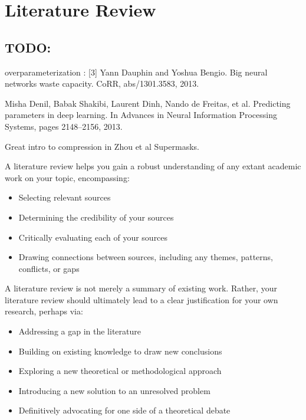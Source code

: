 \section{Literature Review}

\subsection{TODO: }
overparameterization : [3] Yann Dauphin and Yoshua Bengio. Big neural networks waste capacity. CoRR, abs/1301.3583, 2013.

Misha Denil, Babak Shakibi, Laurent Dinh, Nando de Freitas, et al. Predicting parameters in deep learning. In Advances in Neural Information Processing Systems, pages 2148–2156, 2013.

Great intro to compression in Zhou et al Supermasks.

A literature review helps you gain a robust understanding of any extant academic work on your topic, encompassing:
\begin{itemize}
    \item Selecting relevant sources
    \item Determining the credibility of your sources
    \item Critically evaluating each of your sources
    \item Drawing connections between sources, including any themes, patterns, conflicts, or gaps
  \end{itemize}


A literature review is not merely a summary of existing work. Rather, your literature review should ultimately lead to a clear justification for your own research, perhaps via:
\begin{itemize}
    \item Addressing a gap in the literature
    \item Building on existing knowledge to draw new conclusions
    \item Exploring a new theoretical or methodological approach
    \item Introducing a new solution to an unresolved problem
    \item Definitively advocating for one side of a theoretical debate
\end{itemize}

